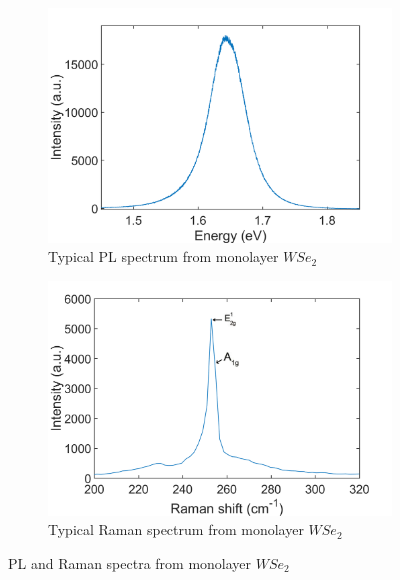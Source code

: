 \begin{figure}[H]
	\begin{center}
		\begin{subfigure}[b]{0.45\textwidth}
			\includegraphics[width=\textwidth]{WSe2/PLSpectrum.png}
			\caption{Typical PL spectrum from monolayer $WSe_2$}
			\label{fig:WSe2PLSpectrum}
		\end{subfigure}
		\qquad
		\begin{subfigure}[b]{0.45\textwidth}
			\includegraphics[width=\textwidth]{WSe2/RamanSpectrum.png}
			\caption{Typical Raman spectrum from monolayer $WSe_2$}
			\label{fig:WSe2RamanSpectrum}
		\end{subfigure}
		\caption{PL and Raman spectra from monolayer $WSe_2$}
		\label{fig:WSe2PLRamanSpectra}
	\end{center}
\end{figure}
	
